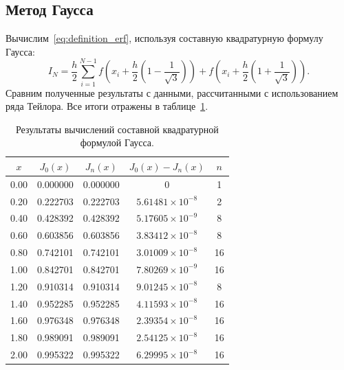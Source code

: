 \documentclass[a4paper, 14pt]{extarticle}
\begin{document}
    \subsection{Метод Гаусса}\label{subsec:gaussian}
    Вычислим~\eqref{eq:definition_erf}, используя составную квадратурную формулу Гаусса:
    \begin{equation}
        \label{eq:Quadrature_Formula_Gauss}
        I_{N} = \frac{h}{2} \sum\limits_{i=1}^{N-1} f\left(x_i + \frac{h}{2}\left(1 - \frac{1}{\sqrt{3}}\right)\right) + f\left(x_i + \frac{h}{2}\left(1 + \frac{1}{\sqrt{3}}\right)\right).
    \end{equation}
    Сравним полученные результаты с данными, рассчитанными с использованием ряда Тейлора.
    Все итоги отражены в таблице~\ref{tab:Gauss}.
    \begin{table}[H]
        \centering
        \begin{tabular}{|c|c|c|c|c|}
            \hline
            $x$  & $J_0(x)$ & $J_n(x)$ & $J_0(x)-J_n(x)$        & $n$ \\ \hline
            0.00 & 0.000000 & 0.000000 & 0                      & 1   \\ \hline
            0.20 & 0.222703 & 0.222703 & $5.61481\times10^{-8}$ & 2   \\ \hline
            0.40 & 0.428392 & 0.428392 & $5.17605\times10^{-9}$ & 8   \\ \hline
            0.60 & 0.603856 & 0.603856 & $3.83412\times10^{-8}$ & 8   \\ \hline
            0.80 & 0.742101 & 0.742101 & $3.01009\times10^{-8}$ & 16  \\ \hline
            1.00 & 0.842701 & 0.842701 & $7.80269\times10^{-9}$ & 16  \\ \hline
            1.20 & 0.910314 & 0.910314 & $9.01245\times10^{-8}$ & 8   \\ \hline
            1.40 & 0.952285 & 0.952285 & $4.11593\times10^{-8}$ & 16  \\ \hline
            1.60 & 0.976348 & 0.976348 & $2.39354\times10^{-8}$ & 16  \\ \hline
            1.80 & 0.989091 & 0.989091 & $2.54125\times10^{-8}$ & 16  \\ \hline
            2.00 & 0.995322 & 0.995322 & $6.29995\times10^{-8}$ & 16  \\ \hline
        \end{tabular}
        \caption{Результаты вычислений составной квадратурной формулой Гаусса.}
        \label{tab:Gauss}
    \end{table}
\end{document}
